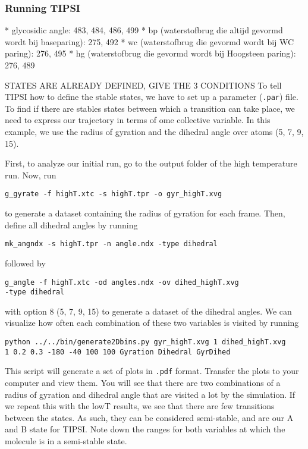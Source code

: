 \documentclass[]{article}
\begin{document}
\subsubsection*{Running TIPSI}

* glycosidic angle: 483, 484, 486, 499
* bp (waterstofbrug die altijd gevormd wordt bij baseparing): 275, 492
* wc (waterstofbrug die gevormd wordt bij WC paring): 276, 495
* hg (waterstofbrug die gevormd wordt bij Hoogsteen paring): 276, 489

STATES ARE ALREADY DEFINED, GIVE THE 3 CONDITIONS
To tell \textsc{TIPSI} how to define the stable states, we have to set up a parameter (\texttt{.par}) file. To find if there are stables states between which a transition can take place, we need to express our trajectory in terms of ome collective variable. In this example, we use the radius of gyration and the dihedral angle over atoms (5, 7, 9, 15).

First, to analyze our initial run, go to the output folder of the high temperature run. Now, run
%
\begin{lstlisting}
g_gyrate -f highT.xtc -s highT.tpr -o gyr_highT.xvg
\end{lstlisting}
%
to generate a dataset containing the radius of gyration for each frame. Then, define all dihedral angles by running
%
\begin{lstlisting}
mk_angndx -s highT.tpr -n angle.ndx -type dihedral
\end{lstlisting}
%
followed by
%
\begin{lstlisting}
g_angle -f highT.xtc -od angles.ndx -ov dihed_highT.xvg 
-type dihedral
\end{lstlisting}
%
with option 8 (5, 7, 9, 15) to generate a dataset of the dihedral angles. We can visualize how often each combination of these two variables is visited by running
%
\begin{lstlisting}
python ../../bin/generate2Dbins.py gyr_highT.xvg 1 dihed_highT.xvg 
1 0.2 0.3 -180 -40 100 100 Gyration Dihedral GyrDihed
\end{lstlisting}
%
This script will generate a set of plots in \texttt{.pdf} format. Transfer the plots to your computer and view them. You will see that there are two combinations of a radius of gyration and dihedral angle that are visited a lot by the simulation. If we repeat this with the lowT results, we see that there are few transitions between the states. As such, they can be considered semi-stable, and are our A and B state for \textsc{TIPSI}. Note down the ranges for both variables at which the molecule is in a semi-stable state.
\end{document}
